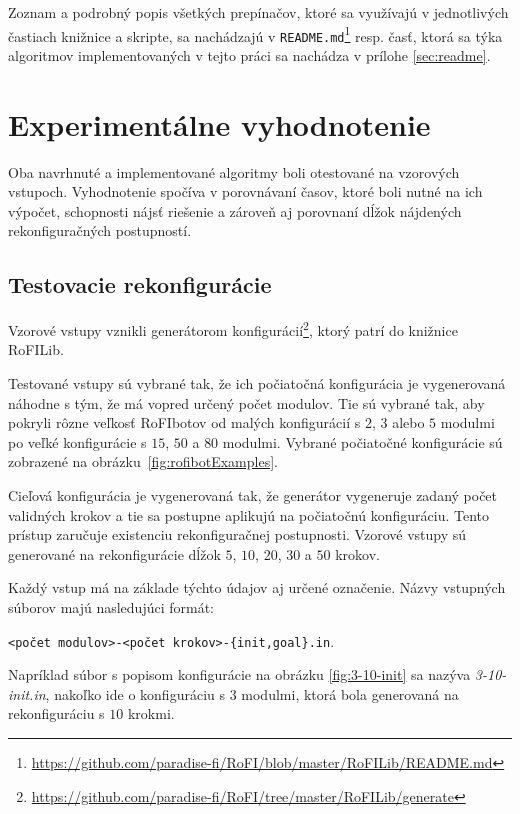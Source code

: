 \documentclass[
  printed, %
  oneside, %
  notable,   %
  nolof,     %
  nolot,     %
]{fithesis3}
\begin{document}
Zoznam a podrobný popis všetkých prepínačov, ktoré sa využívajú v jednotlivých častiach knižnice a skripte, sa nachádzajú v \texttt{README.md}\footnote{\url{https://github.com/paradise-fi/RoFI/blob/master/RoFILib/README.md}} resp. časť, ktorá sa týka algoritmov implementovaných v tejto práci sa nachádza v prílohe \ref{sec:readme}. 





\chapter{Experimentálne vyhodnotenie}
Oba navrhnuté a implementované algoritmy boli otestované na vzorových vstupoch. Vyhodnotenie spočíva v porovnávaní časov, ktoré boli nutné na ich výpočet, schopnosti nájsť riešenie a zároveň aj porovnaní dĺžok nájdených rekonfiguračných postupností. 

\section{Testovacie rekonfigurácie}
Vzorové vstupy vznikli generátorom konfigurácií\footnote{\url{https://github.com/paradise-fi/RoFI/tree/master/RoFILib/generate}}, ktorý patrí do knižnice RoFILib. 

Testované vstupy sú vybrané tak, že ich počiatočná konfigurácia je vygenerovaná náhodne s tým, že má vopred určený počet modulov. Tie sú vybrané tak, aby pokryli rôzne veľkosť RoFIbotov od malých konfigurácií s $2$, $3$ alebo $5$ modulmi po veľké konfigurácie s $15$, $50$ a $80$ modulmi. Vybrané počiatočné konfigurácie sú zobrazené na obrázku~\ref{fig:rofibotExamples}. 

Cieľová konfigurácia je vygenerovaná tak, že generátor vygeneruje zadaný počet validných krokov a tie sa postupne aplikujú na počiatočnú konfiguráciu. Tento prístup zaručuje existenciu rekonfiguračnej postupnosti. Vzorové vstupy sú generované na rekonfigurácie dĺžok $5$, $10$, $20$, $30$ a $50$ krokov. 

Každý vstup má na základe týchto údajov aj určené označenie. Názvy vstupných súborov majú nasledujúci formát:

\texttt{<počet modulov>-<počet krokov>-\{init,goal\}.in}. 

Napríklad súbor s popisom konfigurácie na obrázku \ref{fig:3-10-init} sa nazýva \textit{3-10-init.in}, nakoľko ide o konfiguráciu s $3$ modulmi, ktorá bola generovaná na rekonfiguráciu s $10$ krokmi. 
\end{document}
